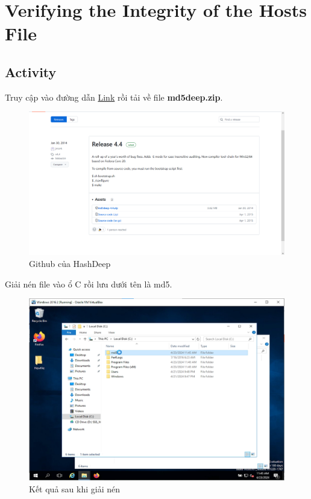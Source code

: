 \section{Verifying the Integrity of the Hosts  File}
\subsection{Activity}

 Truy cập vào đường dẫn \href{https://github.com/jessek/hashdeep/releases}{Link} rồi tải về file \textbf{md5deep.zip}.

\begin{figure}[!htb]
    \centering
    \includegraphics[width=1\linewidth]{figure//chapter9//lab9_1/hashdeep.png}
    \caption{Github của HashDeep}
    \label{fig:enter-label}
\end{figure}

 Giải nén file vào ổ C rồi lưu dưới tên là md5.

\begin{figure}[!htb]
    \centering
    \includegraphics[width=0.9\linewidth]{figure//chapter9//lab9_1/extract.png}
    \caption{Kết quả sau khi giải nén}
    \label{fig:enter-label}
\end{figure}

